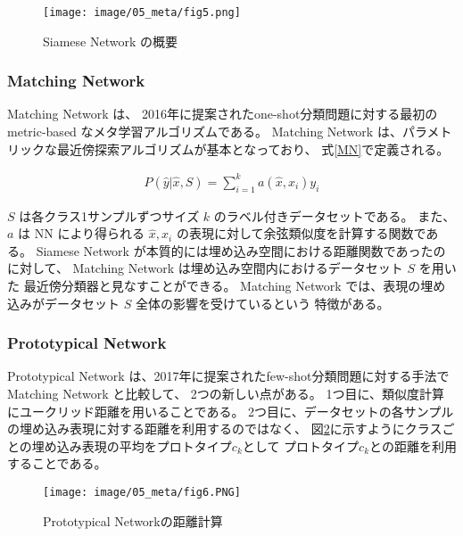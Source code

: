 \documentclass{jsarticle}
\begin{document}
\begin{figure}[H]
  \begin{center}
    \texttt{[image: image/05\_meta/fig5.png]}
    \caption{Siamese Network の概要\cite{MetricLe5:online}}
    \label{fig:fig5}
  \end{center}
\end{figure}


\subsubsection{Matching Network}
Matching Network は、
2016年に提案されたone-shot分類問題に対する最初の metric-based なメタ学習アルゴリズムである。
Matching Network は、パラメトリックな最近傍探索アルゴリズムが基本となっており、
式\ref{MN}で定義される。

\begin{eqnarray}
  \label{MN}
  P(\hat y | \hat x, S) = \sum_{i=1}^k a(\hat x, x_i)y_i 
\end{eqnarray}

$S$ は各クラス1サンプルずつサイズ $k$ のラベル付きデータセットである。
また、$a$ は NN により得られる $\hat x, x_i$ の表現に対して余弦類似度を計算する関数である。
Siamese Network が本質的には埋め込み空間における距離関数であったのに対して、
Matching Network は埋め込み空間内におけるデータセット $S$ を用いた
最近傍分類器と見なすことができる。
Matching Network では、表現の埋め込みがデータセット $S$ 全体の影響を受けているという
特徴がある。

\subsubsection{Prototypical Network}
Prototypical Network は、2017年に提案されたfew-shot分類問題に対する手法で
Matching Network と比較して、
2つの新しい点がある。
1つ目に、類似度計算にユークリッド距離を用いることである。
2つ目に、データセットの各サンプルの埋め込み表現に対する距離を利用するのではなく、
図\ref{fig:fig6}に示すようにクラスごとの埋め込み表現の平均をプロトタイプ$c_k$として
プロトタイプ$c_k$との距離を利用することである。

\begin{figure}[H]
  \begin{center}
    \texttt{[image: image/05\_meta/fig6.PNG]}
    \caption{Prototypical Networkの距離計算\cite{snell2017prototypical}}
    \label{fig:fig6}
  \end{center}
\end{figure}
\end{document}
